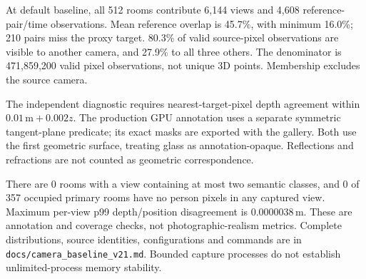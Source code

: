 At default baseline, all 512 rooms contribute 6,144 views and 4,608 reference-pair/time observations. Mean reference overlap is 45.7\%, with minimum 16.0\%; 210 pairs miss the proxy target. 80.3\% of valid source-pixel observations are visible to another camera, and 27.9\% to all three others. The denominator is 471,859,200 valid pixel observations, not unique 3D points. Membership excludes the source camera.

The independent diagnostic requires nearest-target-pixel depth agreement within $0.01\,\mathrm{m}+0.002z$. The production GPU annotation uses a separate symmetric tangent-plane predicate; its exact masks are exported with the gallery. Both use the first geometric surface, treating glass as annotation-opaque. Reflections and refractions are not counted as geometric correspondence.

There are 0 rooms with a view containing at most two semantic classes, and 0 of 357 occupied primary rooms have no person pixels in any captured view. Maximum per-view p99 depth/position disagreement is 0.0000038\,m. These are annotation and coverage checks, not photographic-realism metrics. Complete distributions, source identities, configurations and commands are in \texttt{docs/camera\_baseline\_v21.md}. Bounded capture processes do not establish unlimited-process memory stability.
